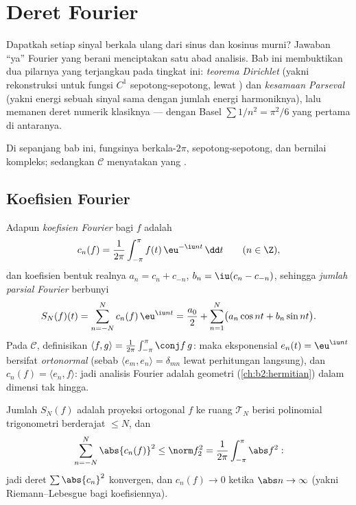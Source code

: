 \chapter{Deret Fourier}\label{ch:b2:fourier}

Dapatkah setiap sinyal berkala  ulang dari sinus dan kosinus murni?
Jawaban ``ya'' Fourier yang berani menciptakan satu abad analisis. Bab
ini membuktikan dua pilarnya yang terjangkau pada tingkat ini:
\emph{teorema Dirichlet} (yakni rekonstruksi  untuk fungsi
$C^1$ sepotong-sepotong, lewat ) dan \emph{kesamaan Parseval}
(yakni energi sebuah sinyal sama dengan jumlah energi harmoniknya), lalu
memanen deret numerik klasiknya --- dengan Basel $\sum 1/n^2 =
\pi^2/6$ yang pertama di antaranya.

Di sepanjang bab ini, fungsinya berkala-$2\pi$,  sepotong-sepotong,
dan bernilai kompleks; sedangkan $\mathcal{C}$ menyatakan yang .

\section{Koefisien Fourier}

\begin{definition}\label{def:b2:fourier:coefficients}
Adapun \emph{koefisien Fourier} bagi $f$
adalah
\[
c_n(f) = \frac{1}{2\pi}\int_{-\pi}^{\pi} f(t)\,\eu^{-\iu n t}\,\dd
t \qquad (n \in \Z),
\]
dan koefisien bentuk realnya $a_n = c_n + c_{-n}$, $b_n = \iu(c_n
- c_{-n})$, sehingga \emph{jumlah parsial Fourier} berbunyi
\[
S_N(f)(t) = \sum_{n=-N}^{N} c_n(f)\,\eu^{\iu nt}
= \frac{a_0}{2} + \sum_{n=1}^{N}\bigl(a_n\cos nt + b_n \sin
nt\bigr).
\]
Pada $\mathcal{C}$, definisikan  $\langle f,
g\rangle = \frac{1}{2\pi}\int_{-\pi}^{\pi}\conj f\,g$: maka
eksponensial $e_n(t) = \eu^{\iu nt}$ bersifat \emph{ortonormal}
(sebab $\langle e_m, e_n\rangle = \delta_{mn}$ lewat perhitungan langsung), dan
$c_n(f) = \langle e_n, f\rangle$: jadi analisis Fourier adalah geometri
 (\cref{ch:b2:hermitian}) dalam dimensi tak hingga.
\end{definition}

\begin{proposition}\label{prop:b2:fourier:bessel}
Jumlah $S_N(f)$ adalah proyeksi ortogonal $f$ ke ruang
$\mathcal{T}_N$ berisi polinomial trigonometri berderajat $\leq N$,
dan
\[
\sum_{n=-N}^{N} \abs{c_n(f)}^2 \leq \norm f_2^2 =
\frac{1}{2\pi}\int_{-\pi}^{\pi} \abs f^2 :
\]
jadi deret $\sum \abs{c_n}^2$ konvergen, dan $c_n(f) \to 0$ ketika
$\abs n \to \infty$ (yakni Riemann--Lebesgue bagi koefisiennya).
\end{proposition}

